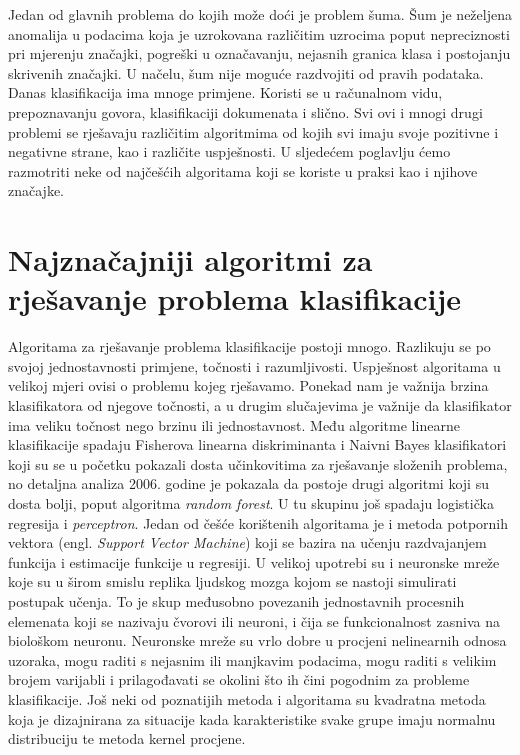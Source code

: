 \documentclass[times, utf8, zavrsni]{fer}
\begin{document}
Jedan od glavnih problema do kojih može doći je problem šuma. Šum je neželjena anomalija u podacima koja je uzrokovana različitim uzrocima poput nepreciznosti pri mjerenju značajki, pogreški u označavanju, nejasnih granica klasa i postojanju skrivenih značajki. U načelu, šum nije moguće razdvojiti od pravih podataka. Danas klasifikacija ima mnoge primjene. Koristi se u računalnom vidu, prepoznavanju govora, klasifikaciji dokumenata i slično. Svi ovi i mnogi drugi problemi se rješavaju različitim algoritmima od kojih svi imaju svoje pozitivne i negativne strane, kao i različite uspješnosti. U sljedećem poglavlju ćemo razmotriti neke od najčešćih algoritama koji se koriste u praksi kao i njihove značajke. 

\section{Najznačajniji algoritmi za rješavanje problema klasifikacije}
Algoritama za rješavanje problema klasifikacije postoji mnogo. Razlikuju se po svojoj jednostavnosti primjene, točnosti i razumljivosti. Uspješnost algoritama u velikoj mjeri ovisi o problemu kojeg rješavamo. Ponekad nam je važnija brzina klasifikatora od njegove točnosti, a u drugim slučajevima je važnije da klasifikator ima veliku točnost nego brzinu ili jednostavnost. Među algoritme linearne klasifikacije spadaju Fisherova linearna diskriminanta i Naivni Bayes klasifikatori koji su se u početku pokazali dosta učinkovitima za rješavanje složenih problema, no detaljna analiza 2006. godine je pokazala da postoje drugi algoritmi koji su dosta bolji, poput algoritma \textit{random forest}. U tu skupinu još spadaju logistička regresija i \textit{perceptron}. Jedan od češće korištenih algoritama je i metoda potpornih vektora (engl. \textit{Support Vector Machine}) koji se bazira na učenju razdvajanjem funkcija i estimacije funkcije u regresiji. U velikoj upotrebi su i neuronske mreže koje su u širom smislu replika ljudskog mozga kojom se nastoji simulirati postupak učenja. To je skup međusobno povezanih jednostavnih procesnih elemenata koji se nazivaju čvorovi ili neuroni, i čija se funkcionalnost zasniva na biološkom neuronu. Neuronske mreže su vrlo dobre u procjeni nelinearnih odnosa uzoraka, mogu raditi s nejasnim ili manjkavim podacima, mogu raditi s velikim brojem varijabli i prilagođavati se okolini što ih čini pogodnim za probleme klasifikacije. Još neki od poznatijih metoda i algoritama su kvadratna metoda koja je dizajnirana za situacije kada karakteristike svake grupe imaju normalnu distribuciju te metoda kernel procjene.
\end{document}
